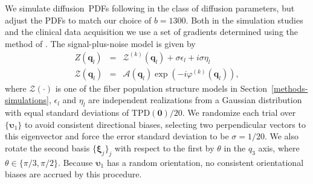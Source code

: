 \documentclass[authoryear,preprint,12pt]{elsarticle}
\newcommand{\q}{\mathbf{q}}
\newcommand{\bsu}{\bs{\upsilon}}
\newcommand{\cA}{\mathcal{A}}
\newcommand{\cZ}{\mathcal{Z}}
\newcommand{\bld}[1]{\mathbf{#1}}
\newcommand{\bs}[1]{\boldsymbol{#1}}
\begin{document}
We simulate diffusion~PDFs following \citet{Alexander2005} in the
class of diffusion parameters, but adjust the PDFs to match our choice
of $b=1300$.  Both in the simulation studies and the clinical data
acquisition we use a set of gradients determined using the method of
\citet{DKJones99}.  The signal-plus-noise model is given by
\begin{eqnarray}
  Z(\q_l) &=& \cZ^{(k)}(\q_l) + \sigma\epsilon_l + i\sigma\eta_l\\
  \cZ(\q_l) &=& \cA(\q_l) \exp\left(-i\varphi^{(k)}(\q_l)\right),
\end{eqnarray}
where $\cZ(\cdot)$ is one of the fiber population structure models in
Section~\ref{methods-simulations}, $\epsilon_l$ and $\eta_l$ are
independent realizations from a Gaussian distribution with equal
standard deviations of $\text{TPD}(\bld{0})/20$.  We randomize each
trial over $\{\bsu_1\}$ to avoid consistent directional biases,
selecting two perpendicular vectors to this eigenvector and force the
error standard deviation to be $\sigma=1/20$.  We also rotate the
second basis $\{\bs{\xi}_j\}_j$ with respect to the first by $\theta$
in the $q_3$ axis, where $\theta\in\{\pi/3,\pi/2\}$.  Because $\bsu_1$
has a random orientation, no consistent orientational biases are
accrued by this procedure.
\end{document}
